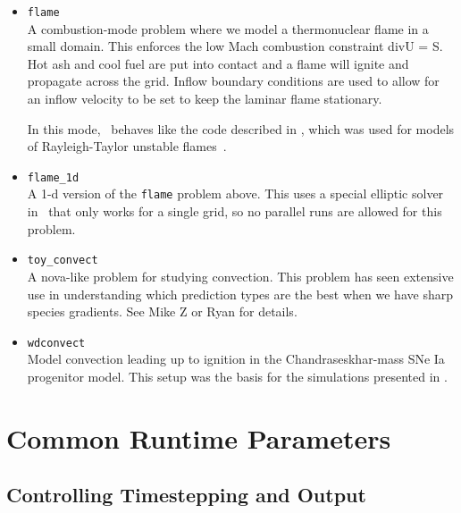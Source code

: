 \begin{itemize}

\item {\tt flame} \\[-3mm]

   A combustion-mode problem where we model a thermonuclear flame in a
   small domain.  This enforces the low Mach combustion constraint
   div{U} = S.  Hot ash and cool fuel are put into contact and a flame
   will ignite and propagate across the grid.  Inflow boundary
   conditions are used to allow for an inflow velocity to be set to
   keep the laminar flame stationary.

   In this mode, \maestro\ behaves like the code described
   in \cite{SNe}, which was used for models of Rayleigh-Taylor
   unstable flames~\cite{SNld,SNrt,SNrt3d}.

\item {\tt flame\_1d} \\[-3mm]

   A 1-d version of the {\tt flame} problem above.  This uses a special
   elliptic solver in \amrex\ that only works for a single grid, so
   no parallel runs are allowed for this problem.
   
\item {\tt toy\_convect} \\[-3mm]

A nova-like problem for studying convection.  This problem has seen
extensive use in understanding which prediction types are the best
when we have sharp species gradients.  See Mike Z or Ryan for details.

\item {\tt wdconvect} \\[-3mm]

Model convection leading up to ignition in the Chandraseskhar-mass SNe
Ia progenitor model.  This setup was the basis for the simulations
presented in \cite{lowMach4,wdconvect,wdturb}.


\end{itemize}


\section{Common Runtime Parameters}
\label{sec:gettingstarted:runtime}

\subsection{Controlling Timestepping and Output}


